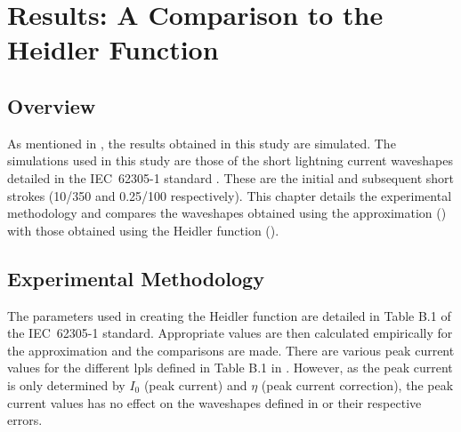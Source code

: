 
\chapter{Results: A Comparison to the Heidler Function} %

\label{ChapterResults} %


\begin{quote}
\end{quote}


\section{Overview}
\label{sec:results_overview}
As mentioned in , the results obtained in this study are simulated. The simulations used in this study are those of the short lightning current waveshapes detailed in the IEC~62305-1 standard \cite{IEC623051}. These are the initial and subsequent short strokes (10/350 and 0.25/100 respectively). This chapter details the experimental methodology and compares the waveshapes obtained using the approximation () with those obtained using the Heidler function ().


\section{Experimental Methodology}
\label{sec:results_experimental_methodology}
The parameters used in creating the Heidler function are detailed in Table B.1 of the IEC~62305-1 standard. Appropriate values are then calculated empirically for the approximation and the comparisons are made. There are various peak current values for the different \glspl{lpl} defined in Table B.1 in \cite{IEC623051}. However, as the peak current is only determined by $I_0$ (peak current) and $\eta$ (peak current correction), the peak current values has no effect on the waveshapes defined in  or their respective errors.

